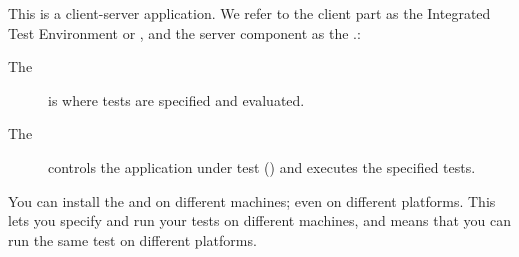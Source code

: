 
This is a client-server application. We refer to the client part as the Integrated Test Environment or \ite{}, and the server component as the \gdagent{}.:  
\begin{description}
\item[The \ite{}]{is where tests are specified and evaluated.}
\item [The \gdagent{}]{controls the application under test (\gdaut{}) and executes the specified tests. }
\end{description}

 You can install the \ite{} and \gdagent{} on different machines; even on different platforms. This lets you specify and run  your tests on different machines, and means that you can run the same test on different platforms. 

